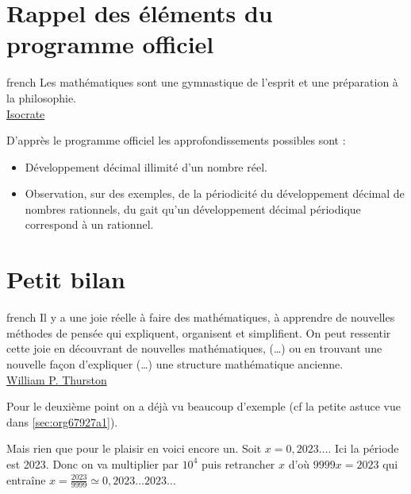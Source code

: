\documentclass[a4paper, 11pt, twoside]{book}
\begin{document}
\chapter{Rappel des éléments du programme officiel}
\label{sec:org31d8817}
\startcontents[level-2]

\begin{foreigndisplayquote}{french}
Les mathématiques sont une gymnastique de l'esprit et une
préparation à la philosophie. \\

\href{https://fr.wikipedia.org/wiki/Isocrate}{Isocrate}
\end{foreigndisplayquote}

D'apprès le programme officiel les approfondissements possibles
sont :
\begin{itemize}
\item Développement décimal illimité d'un nombre réel.
\item Observation, sur des exemples, de la périodicité du développement
décimal de nombres rationnels, du gait qu'un développement décimal
périodique correspond à un rationnel.
\end{itemize}
\stopcontents[level-2]

\chapter{Petit bilan}
\label{sec:org2b46cf0}
\startcontents[level-2]

\begin{foreigndisplayquote}{french}
Il y a une joie réelle à faire des mathématiques, à apprendre de
nouvelles méthodes de pensée qui expliquent, organisent et
simplifient. On peut ressentir cette joie en découvrant de
nouvelles mathématiques, (…) ou en trouvant une nouvelle façon
d’expliquer (…) une structure mathématique ancienne. \\

\href{https://en.wikipedia.org/wiki/William\_Thurston}{William P. Thurston}
\end{foreigndisplayquote}

Pour le deuxième point on a déjà vu beaucoup d'exemple (cf la petite
astuce vue dans \ref{sec:org67927a1}).

Mais rien que pour le plaisir en voici encore un. Soit \(x =
  0,2023\dots\). Ici la période est 2023. Donc on va multiplier par
\(10^4\) puis retrancher \(x\) d'où \(9999x = 2023\) qui entraîne \(x =
  \frac{2023}{9999} \simeq 0,2023\dots 2023\dots\)
\stopcontents[level-2]
\end{document}
